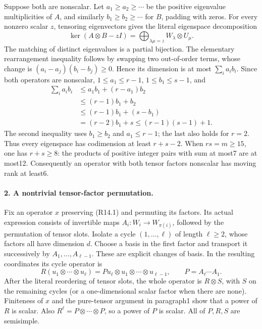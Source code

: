 Suppose both are nonscalar. Let \(a_1\ge a_2\ge\cdots\)
be the positive eigenvalue multiplicities of \(A\), and
similarly \(b_1\ge b_2\ge\cdots\) for \(B\), padding
with zeros. For every nonzero scalar \(z\), tensoring
eigenvectors gives the literal eigenspace decomposition
\[
 \ker(A\otimes B-zI)
   =\bigoplus_{\lambda\mu=z} W_\lambda\otimes U_\mu.
                                                               \tag{R14.2}
\]
The matching of distinct eigenvalues is a partial bijection.
The elementary rearrangement inequality follows by swapping
two out-of-order terms, whose change is
\((a_i-a_j)(b_i-b_j)\ge0\). Hence its dimension is at most
\(\sum_i a_i b_i\). Since both operators are nonscalar,
\(1\le a_1\le r-1\), \(1\le b_1\le s-1\), and
\[
 \begin{aligned}
 \sum_i a_i b_i
 &\le a_1b_1+(r-a_1)b_2\\
 &\le(r-1)b_1+b_2\\
 &\le(r-1)b_1+(s-b_1)\\
 &=(r-2)b_1+s
 \le(r-1)(s-1)+1.
 \end{aligned}                                               \tag{R14.3}
\]
The second inequality uses \(b_1\ge b_2\) and
\(a_1\le r-1\); the last also holds for \(r=2\).
Thus every eigenspace has codimension at least
\(r+s-2\). When \(rs=m\ge15\), one has \(r+s\ge8\):
the products of positive integer pairs with sum at most7
are at most12. Consequently an operator with both tensor
factors nonscalar has moving rank at least6.

\paragraph{2. A nontrivial tensor-factor permutation.}
Fix an operator \(x\) preserving (R14.1) and permuting its
factors. Its actual expression consists of invertible maps
\(A_i:W_i\longrightarrow W_{\pi(i)}\), followed by the
permutation of tensor slots. Isolate a cycle
\((1,\ldots,\ell)\) of length \(\ell\ge2\), whose
factors all have dimension \(d\). Choose a basis in the
first factor and transport it successively by
\(A_1,\ldots,A_{\ell-1}\). These are explicit changes of
basis. In the resulting coordinates its cycle operator is
\[
 R(u_1\otimes\cdots\otimes u_\ell)
       =P u_\ell\otimes u_1\otimes\cdots\otimes u_{\ell-1},
 \qquad P=A_\ell\cdots A_1.                              \tag{R14.4}
\]
After the literal reordering of tensor slots, the whole
operator is \(R\otimes S\), with \(S\) on the remaining
cycles (or a one-dimensional scalar factor when there are
none). Finiteness of \(x\) and the pure-tensor argument in
paragraph1 show that a power of \(R\) is scalar. Also
\(R^\ell=P\otimes\cdots\otimes P\), so a power of
\(P\) is scalar. All of \(P,R,S\) are semisimple.

